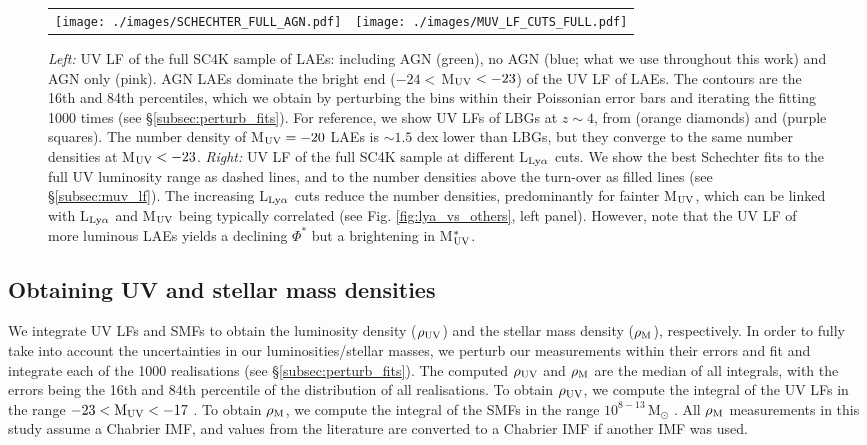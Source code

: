 \documentclass[a4paper,fleqn,usenatbib]{mnras}
\begin{document}
%
%
\begin{figure*}
  \centering
\begin{tabular}{ll}
  \centering
  \texttt{[image: ./images/SCHECHTER\_FULL\_AGN.pdf]}
  &
  \texttt{[image: ./images/MUV\_LF\_CUTS\_FULL.pdf]}  
\end{tabular}
  \caption{{\it Left:} UV LF of the full SC4K sample of LAEs: including AGN (green), no AGN (blue; what we use throughout this work) and AGN only (pink). AGN LAEs dominate the bright end ($-24<$\,M$_{\rm UV}<-23$) of the UV LF of LAEs. The contours are the 16th and 84th percentiles, which we obtain by perturbing the bins within their Poissonian error bars and iterating the fitting 1000 times (see \S\ref{subsec:perturb_fits}). For reference, we show UV LFs of LBGs at $z\sim4$, from \citet{Bouwens2015} (orange diamonds) and \citet{Ono2018} (purple squares). The number density of M$_{\rm UV}=-20$ LAEs is $\sim1.5$ dex lower than LBGs, but they converge to the same number densities at M$_{\rm UV}<-23$. {\it Right:} UV LF of the full SC4K sample at different L$_{\rm Ly\alpha}$ cuts. We show the best Schechter fits to the full UV luminosity range as dashed lines, and to the number densities above the turn-over as filled lines (see \S\ref{subsec:muv_lf}). The increasing L$_{\rm Ly\alpha}$ cuts reduce the number densities, predominantly for fainter M$_{\rm UV}$, which can be linked with L$_{\rm Ly\alpha}$ and M$_{\rm UV}$ being typically correlated (see Fig. \ref{fig:lya_vs_others}, left panel). However, note that the UV LF of more luminous LAEs yields a declining $\Phi^*$ but a brightening in M$_{\rm UV}^*$.}
\label{fig:lf_full}
\end{figure*}


\subsection{Obtaining UV and stellar mass densities} \label{subsec:methods_densities}

We integrate UV LFs and SMFs to obtain the luminosity density ($\rho_{\rm UV}$) and the stellar mass density ($\rho_{\rm M}$), respectively. In order to fully take into account the uncertainties in our luminosities/stellar masses, we perturb our measurements within their errors and fit and integrate each of the 1000 realisations (see \S\ref{subsec:perturb_fits}). The computed $\rho_{\rm UV}$ and $\rho_{\rm M}$ are the median of all integrals, with the errors being the 16th and 84th percentile of the distribution of all realisations. To obtain $\rho_{\rm UV}$, we compute the integral of the UV LFs in the range $-23 < {\rm M_{UV}} < -17$ \citep[similar to e.g.][]{Finkelstein2015,Bouwens2015}. To obtain $\rho_{\rm M}$, we compute the integral of the SMFs in the range $10^{8-13}$\,M$_\odot$ \citep[similar to e.g.][]{Davidzon2017}. All $\rho_{\rm M}$ measurements in this study assume a Chabrier IMF, and values from the literature are converted to a Chabrier IMF if another IMF was used. 
\end{document}
